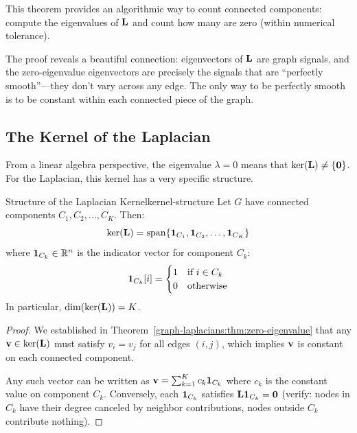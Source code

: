 \begin{notechapter}
\begin{remark}
This theorem provides an algorithmic way to count connected components: compute the eigenvalues of $\mathbf{L}$ and count how many are zero (within numerical tolerance).
\end{remark}

\begin{intuition}
The proof reveals a beautiful connection: eigenvectors of $\mathbf{L}$ are graph signals, and the zero-eigenvalue eigenvectors are precisely the signals that are ``perfectly smooth''---they don't vary across any edge. The only way to be perfectly smooth is to be constant within each connected piece of the graph.
\end{intuition}

\subsection{The Kernel of the Laplacian}

From a linear algebra perspective, the eigenvalue $\lambda = 0$ means that $\ker(\mathbf{L}) \neq \{\mathbf{0}\}$. For the Laplacian, this kernel has a very specific structure.

\begin{theorem}{Structure of the Laplacian Kernel}{kernel-structure}
Let $G$ have connected components $C_1, C_2, \ldots, C_K$. Then:
\begin{equation}
\ker(\mathbf{L}) = \mathrm{span}\{\mathbf{1}_{C_1}, \mathbf{1}_{C_2}, \ldots, \mathbf{1}_{C_K}\}
\end{equation}
where $\mathbf{1}_{C_k} \in \mathbb{R}^n$ is the indicator vector for component $C_k$:
\[
\mathbf{1}_{C_k}[i] = \begin{cases} 1 & \text{if } i \in C_k \\ 0 & \text{otherwise} \end{cases}
\]
In particular, $\dim(\ker(\mathbf{L})) = K$.
\end{theorem}

\begin{proof}
We established in Theorem~\ref{graph-laplacians:thm:zero-eigenvalue} that any $\mathbf{v} \in \ker(\mathbf{L})$ must satisfy $v_i = v_j$ for all edges $(i,j)$, which implies $\mathbf{v}$ is constant on each connected component.

Any such vector can be written as $\mathbf{v} = \sum_{k=1}^{K} c_k \mathbf{1}_{C_k}$ where $c_k$ is the constant value on component $C_k$. Conversely, each $\mathbf{1}_{C_k}$ satisfies $\mathbf{L} \mathbf{1}_{C_k} = \mathbf{0}$ (verify: nodes in $C_k$ have their degree canceled by neighbor contributions, nodes outside $C_k$ contribute nothing).


\end{proof}
\end{notechapter}
